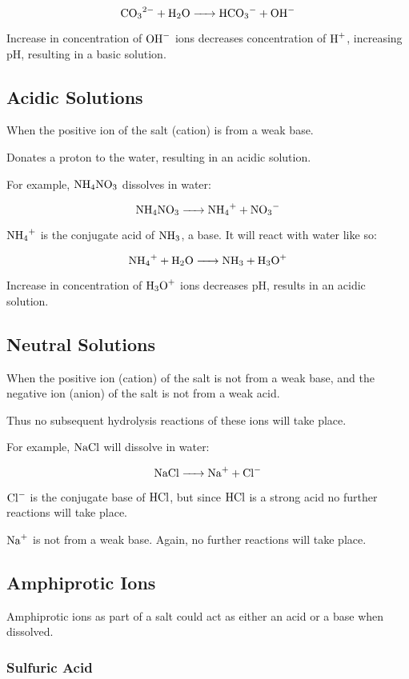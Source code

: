 \documentclass[a4paper,11pt]{article}
\begin{document}
$$
\ce{CO3^2- + H2O -> HCO3- + OH-}
$$

Increase in concentration of $\ce{OH-}$ ions decreases concentration of
$\ce{H+}$, increasing pH, resulting in a basic solution.


\subsection{Acidic Solutions}

When the positive ion of the salt (cation) is from a weak base.

Donates a proton to the water, resulting in an acidic solution.

For example, $\ce{NH4NO3}$ dissolves in water:

$$
\ce{NH4NO3 -> NH4+ + NO3-}
$$

$\ce{NH4+}$ is the conjugate acid of $\ce{NH3}$, a base. It will react with
water like so:

$$
\ce{NH4+ + H2O -> NH3 + H3O+}
$$

Increase in concentration of $\ce{H3O+}$ ions decreases pH, results in an
acidic solution.


\subsection{Neutral Solutions}

When the positive ion (cation) of the salt is not from a weak base, and the
negative ion (anion) of the salt is not from a weak acid.

Thus no subsequent hydrolysis reactions of these ions will take place.

For example, $\ce{NaCl}$ will dissolve in water:

$$
\ce{NaCl -> Na+ + Cl-}
$$

$\ce{Cl-}$ is the conjugate base of $\ce{HCl}$, but since $\ce{HCl}$ is a strong
acid no further reactions will take place.

$\ce{Na+}$ is not from a weak base. Again, no further reactions will take place.


\subsection{Amphiprotic Ions}

Amphiprotic ions as part of a salt could act as either an acid or a base when
dissolved.


\subsubsection{Sulfuric Acid}
\end{document}
